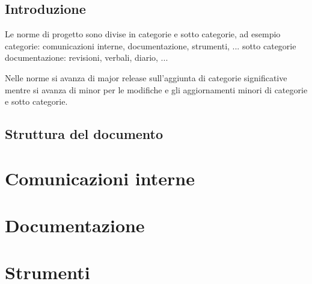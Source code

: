 \documentclass[a4paper, 12pt]{report}
\begin{document}
\tableofcontents

\newpage

\section{Introduzione}
Le norme di progetto sono divise in categorie e sotto categorie, ad esempio 
categorie: comunicazioni interne, documentazione, strumenti, ...
sotto categorie documentazione: revisioni, verbali, diario, ...

Nelle norme si avanza di major release sull'aggiunta di categorie significative mentre si avanza di minor per le modifiche e gli aggiornamenti minori di categorie e sotto categorie.

\section{Struttura del documento}


\chapter{Comunicazioni interne}


\chapter{Documentazione}





\chapter{Strumenti}



\end{document}
